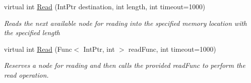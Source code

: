 \begin{DoxyCompactItemize}
virtual int \hyperlink{class_shared_memory_1_1_circular_buffer_a43041d214848b12d2df5af075e6dbf71}{Read} (Int\+Ptr destination, int length, int timeout=1000)
\begin{DoxyCompactList}\small\item\em Reads the next available node for reading into the specified memory location with the specified length \end{DoxyCompactList}\item 
virtual int \hyperlink{class_shared_memory_1_1_circular_buffer_a5301c6f9237dd63eeaf57e4e0560f62e}{Read} (Func$<$ Int\+Ptr, int $>$ read\+Func, int timeout=1000)
\begin{DoxyCompactList}\small\item\em Reserves a node for reading and then calls the provided {\itshape read\+Func}  to perform the read operation. \end{DoxyCompactList}\end{DoxyCompactItemize}
